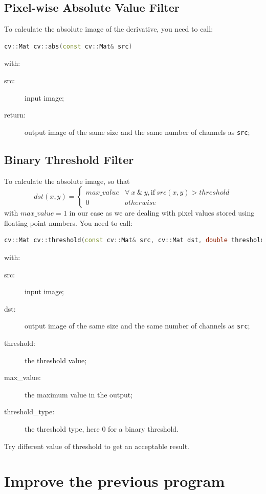 \documentclass[english,a4paper,12pt,oneside]{article}
\begin{document}
\subsection{Pixel-wise Absolute Value Filter}
To calculate the absolute image of the derivative, you need to call:
 \begin{lstlisting}[language=c++]
 cv::Mat cv::abs(const cv::Mat& src)
\end{lstlisting}
with:
\begin{description}
 \item[src:] input image;
 \item[return:] output image of the same size and the same number of channels as \verb+src+;
\end{description}


\subsection{Binary Threshold Filter}

To calculate the absolute image, so that
$$
dst(x,y)=
\left\lbrace	\begin{array}{ll}
		max\_value & \forall~x~\&~y, \mathrm{if}~src(x,y) > threshold\\
		0 & otherwise
	\end{array}
	\right.
$$
with $max\_value = 1$ in our case as we are dealing with pixel values stored using floating point numbers. 
You need to call:
 \begin{lstlisting}[language=c++]
 cv::Mat cv::threshold(const cv::Mat& src, cv::Mat dst, double threshold, double max_value, int threshold_type)
\end{lstlisting}
with:
\begin{description}
 \item[src:] input image;
 \item[dst:] output image of the same size and the same number of channels as \verb+src+;
 \item[threshold:] the threshold value;
 \item[max\_value:] the maximum value in the output;
 \item[threshold\_type:] the threshold type, here 0 for a binary threshold.
\end{description}

Try different value of threshold to get an acceptable result.



\section{Improve the previous program}
\end{document}
